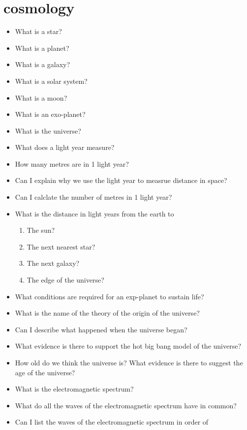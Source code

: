 \section{cosmology}
\begin{multicols}{2}
	\begin{itemize}
		\item What is a star?
		\item What is a planet?
		\item What is a galaxy?
		\item What is a solar system?
		\item What is a moon?
		\item What is an exo-planet?
		\item What is the universe?
		\item What does a light year measure?
		\item How many metres are in 1 light year?
		\item Can I explain why we use the light year to measrue distance in space?
		\item Can I calclate the number of metres in 1 light year?
		\item What is the distance in light years from the earth to
			\begin{enumerate}[label=(\alph*)]
				\item The sun?
				\item The next nearest star?
				\item The next galaxy?
				\item The edge of the universe?
			\end{enumerate}
		\item What conditions are required for an exp-planet to sustain life?
		\item What is the name of the theory of the origin of the universe?
		\item Can I describe what happened when the universe began?
		\item What evidence is there to support the hot big bang model of the
			universe?
		\item How old do we think the universe is? What evidence is there to suggest
			the age of the universe?
		\item What is the electromagnetic spectrum?
		\item What do all the waves of the electromagnetic spectrum have in common?
		\item Can I list the waves of the electromagnetic spectrum in order of
			\begin{enumerate}

\end{enumerate}
\end{itemize}
\end{multicols}
